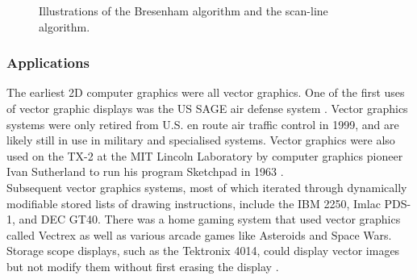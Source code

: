 \documentclass[]{usiinfbachelorproject}
\begin{document}
\begin{figure}[ht]
	\centering
	\caption{Illustrations of  the Bresenham algorithm and  the scan-line algorithm.}
\end{figure}

\subsubsection{Applications}

The earliest 2D computer graphics were all vector graphics. One of the first uses of vector graphic displays was the US SAGE air defense system \cite{Wiki:vector}. Vector graphics systems were only retired from U.S. en route air traffic control in 1999, and are likely still in use in military and specialised systems. Vector graphics were also used on the TX-2 at the MIT Lincoln Laboratory by computer graphics pioneer Ivan Sutherland to run his program Sketchpad in 1963 \cite{Sutherland1963}.\\
Subsequent vector graphics systems, most of which iterated through dynamically modifiable stored lists of drawing instructions, include the IBM 2250, Imlac PDS-1, and DEC GT40. There was a home gaming system that used vector graphics called Vectrex as well as various arcade games like Asteroids and Space Wars. Storage scope displays, such as the Tektronix 4014, could display vector images but not modify them without first erasing the display \cite{Wiki:vector}.
\end{document}
